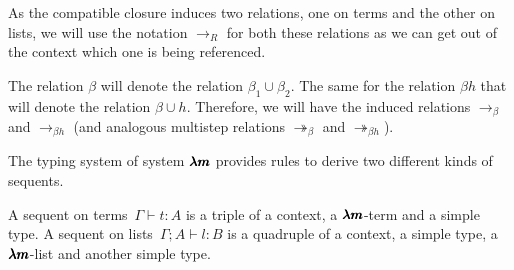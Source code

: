 \begin{remark}
  As the compatible closure induces two relations, one on terms and the other on lists, we will use the notation $\to_R$ for both these relations as we can get out of the context which one is being referenced.
\end{remark}

\begin{notation}
  The relation $\beta$ will denote the relation $\beta_1 \cup \beta_2$.
  The same for the relation $\beta h$ that will denote the relation $\beta \cup h$.
  Therefore, we will have the induced relations $\to_\beta$ and $\to_{\beta h}$ (and analogous multistep relations $\twoheadrightarrow_\beta$ and $\twoheadrightarrow_{\beta h}$).
\end{notation}


\begin{comment}
\begin{definition}[$\beta h$-normal forms]
  We inductively define the sets of $\LamM$-terms and $\LamM$-lists in $\beta h$-normal form, respectively NF and NL, as follows:
  \[
    \begin{prooftree}
      \infer0{ x \in \text{NF} }
    \end{prooftree}
    \qquad
    \begin{prooftree}
      \hypo{ t \in \text{NF} }
      \infer1{ \lambda x . t \in \text{NF} } 
    \end{prooftree}
    \qquad
    \begin{prooftree}
      \hypo{ u \in \text{NF} } 
      \hypo{ l \in \text{NL} }
      \infer2{ x(u, l) \in \text{NF} }
    \end{prooftree}
    \qquad
    \begin{prooftree}
      \infer0{ [] \in \text{NL} } 
    \end{prooftree}
    \qquad
    \begin{prooftree}
      \hypo{ u \in \text{NF} }
      \hypo{ l \in \text{NL} }
      \infer2{ u::l \in \text{NL} }
    \end{prooftree}
  \]
\end{definition}
\end{comment}


The typing system of system $\pmb{\lambda m}$ provides rules to derive two different kinds of sequents.

\begin{definition}[Sequent]
  A sequent on terms~$\Gamma \vdash t:A$ is a triple of a context, a $\pmb{\lambda m}$-term and a simple type.
  A sequent on lists~$\Gamma;A \vdash l:B$ is a quadruple of a context, a simple type, a $\pmb{\lambda m}$-list and another simple type.
\end{definition}


